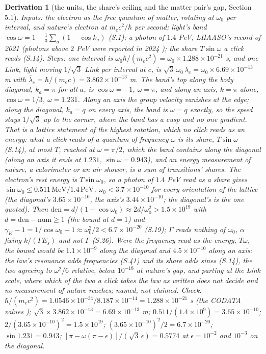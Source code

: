 \documentclass[pdflatex,sn-mathphys-num]{sn-jnl}
\newcommand{\num}{\mathrm{num}}
\newcommand{\den}{\mathrm{den}}
\theoremstyle{thmstyleone}
\newtheorem{derivation}{Derivation}
\begin{document}
\begin{derivation}[the units, the share's ceiling and the matter pair's gap, Section 5.1]
\emph{Inputs:} the electron as the free quantum of matter, rotating at $\omega_0$ per interval, and nature's electron at $m_e c^2 / \hbar$ per second; light's band $\cos\omega = 1 - \frac{1}{3}\sum_a(1 - \cos k_a)$ (S.1); a photon of $1.4$ PeV, LHAASO's record of 2021 \cite{lhaaso} (photons above $2$ PeV were reported in 2024 \cite{lhaaso2024}); the share $T\sin\omega$ a click reads (S.14). \emph{Steps:} one interval is $\omega_0\hbar / (m_e c^2) = \omega_0 \times 1.288 \times 10^{-21}$ s, and one Link, light moving $1 / \sqrt 3$ Link per interval at $c$, is $\sqrt 3\,\omega_0\,\bar\lambda_e = \omega_0 \times 6.69 \times 10^{-13}$ m with $\bar\lambda_e = \hbar / (m_e c) = 3.862 \times 10^{-13}$ m. The band's top along the body diagonal, $k_a = \pi$ for all $a$, is $\cos\omega = -1$, $\omega = \pi$, and along an axis, $k = \pi$ alone, $\cos\omega = 1 / 3$, $\omega = 1.231$. Along an axis the group velocity vanishes at the edge; along the diagonal, $k_a = q$ on every axis, the band is $\omega = q$ exactly, so the speed stays $1 / \sqrt 3$ up to the corner, where the band has a cusp and no one gradient. That is a lattice statement of the highest rotation, which no click reads as an energy: what a click reads of a quantum of frequency $\omega$ is its share, $T\sin\omega$ (S.14), at most $T$, reached at $\omega = \pi / 2$, which the band contains along the diagonal (along an axis it ends at $1.231$, $\sin\omega = 0.943$), and an energy measurement of nature, a calorimeter or an air shower, is a sum of transitions' shares. The electron's rest energy is $T\sin\omega_0$, so a photon of $1.4$ PeV read as a share gives $\sin\omega_0 \le 0.511\,\mathrm{MeV} / 1.4\,\mathrm{PeV}$, $\omega_0 < 3.7 \times 10^{-10}$ for every orientation of the lattice (the diagonal's $3.65 \times 10^{-10}$, the axis's $3.44 \times 10^{-10}$; the diagonal's is the one quoted). Then $\den = d / (1 - \cos\omega_0) \approx 2d / \omega_0^2 > 1.5 \times 10^{19}$ with $d = \den - \num \ge 1$ (the bound at $d = 1$) and $\gamma_K - 1 = 1 / \cos\omega_0 - 1 \approx \omega_0^2 / 2 < 6.7 \times 10^{-20}$ (S.19); $\Gamma$ reads nothing of $\omega_0$, $\alpha$ fixing $k / (\Gamma E_s)$ and not $\Gamma$ (S.26). Were the frequency read as the energy, $T\omega$, the bound would be $1.1 \times 10^{-9}$ along the diagonal and $4.5 \times 10^{-10}$ along an axis: the law's resonance adds frequencies (S.41) and its share adds sines (S.14), the two agreeing to $\omega^2 / 6$ relative, below $10^{-18}$ at nature's gap, and parting at the Link scale, where which of the two a click takes the law as written does not decide and no measurement of nature reaches; named, not claimed. \emph{Check:} $\hbar / (m_e c^2) = 1.0546 \times 10^{-34} / 8.187 \times 10^{-14} = 1.288 \times 10^{-21}$ s (the CODATA values \cite{codata}); $\sqrt 3 \times 3.862 \times 10^{-13} = 6.69 \times 10^{-13}$ m; $0.511 / (1.4 \times 10^9) = 3.65 \times 10^{-10}$; $2 / (3.65 \times 10^{-10})^2 = 1.5 \times 10^{19}$; $(3.65 \times 10^{-10})^2 / 2 = 6.7 \times 10^{-20}$; $\sin 1.231 = 0.943$; $[\pi - \omega(\pi - \epsilon)] / (\sqrt 3\,\epsilon) = 0.5774$ at $\epsilon = 10^{-2}$ and $10^{-3}$ on the diagonal.

\end{derivation}
\end{document}
